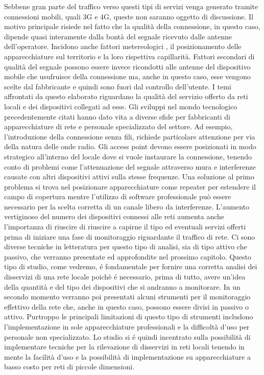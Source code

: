 Sebbene gran parte del traffico verso questi tipi di servizi venga generato tramite connessioni mobili, quali 3G e 4G, queste non saranno oggetto di discussione.
Il motivo principale risiede nel fatto che la qualit\`a della connessione, in questo caso, dipende quasi interamente dalla bont\`a del segnale ricevuto dalle antenne dell'operatore.
Incidono anche fattori metereologici \cite{inproceedings}, il posizionamento delle apparecchiature sul territorio e la loro rispettiva capillarit\`a.
Fattori secondari di qualit\`a del segnale possono essere invece ricondotti alle antenne del dispositivo mobile che usufruisce della connessione ma, anche in questo caso, esse vengono scelte dal fabbricante e quindi sono fuori dal controllo dell'utente.
I temi affrontati da questo elaborato riguardano la qualit\`a del servizio offerto da reti locali e dei dispositivi collegati ad esse.
Gli sviluppi nel mondo tecnologico precedentemente citati hanno dato vita a diverse sfide per fabbricanti di apparecchiature di rete e personale specializzato del settore.
Ad esempio, l'introduzione della connessione senza fili, richiede particolare attenzione per via della natura delle onde radio.
Gli access point devono essere posizionati in modo strategico all'interno del locale dove si vuole instaurare la connessione, tenendo conto di problemi come l'attenuazione del segnale attraverso mura \cite{6971137} e interferenze causate con altri dispositivi attivi sulla stesse frequenze.
Una soluzione al primo problema si trova nel posizionare apparecchiature come repeater per estendere il campo di copertura mentre l'utilizzo di software professionale pu\`o essere necessario per la scelta corretta di un canale libero da interferenze.
L'aumento vertiginoso del numero dei dispositivi connessi alle reti aumenta anche l'importanza di riuscire di riuscire a capirne il tipo ed eventuali servizi offerti prima di iniziare una fase di monitoraggio riguardante il traffico di rete.
Ci sono diverse tecniche in letteratura per questo tipo di analisi, sia di tipo attivo che passivo, che verranno presentate ed approfondite nel prossimo capitolo.
Questo tipo di studio, come vedremo, \'e fondamentale per fornire una corretta analisi dei disservizi di una rete locale poich\`e \'e necessario, prima di tutto, avere un'idea della quantit\`a e del tipo dei dispositivi che si andranno a monitorare.
In un secondo momento verranno poi presentati alcuni strumenti per il monitoraggio effettivo della rete che, anche in questo caso, possono essere divisi in passivo o attivo.
Purtroppo le principali limitazioni di questo tipo di strumenti includono l'implementazione in sole apparecchiature professionali e la difficolt\`a d'uso per personale non specializzato.
Lo studio si \'e quindi incentrato sulla possibilit\`a di implementare tecniche per la rilevazione di disservizi in reti locali tenendo in mente la facilit\`a d'uso e la possibilit\`a di implementazione su apparecchiature a basso costo per reti di piccole dimensioni.

